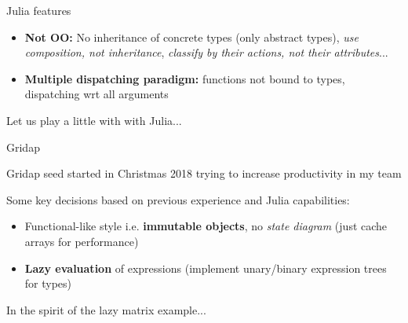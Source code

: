\begin{frame}{Julia features}

\begin{itemize}

  \item \textbf{Not OO:} No inheritance of concrete types (only abstract types), \emph{use composition, not inheritance}, \emph{classify by their actions, not their attributes}...

  \item \textbf{Multiple dispatching paradigm:} functions not bound to types, dispatching wrt all arguments


\end{itemize}

\pause

{\large \color{red} Let us play a little with with Julia...}

\end{frame}

\begin{frame}{Gridap}

Gridap seed started in Christmas 2018 trying to increase productivity in my team

Some key decisions based on previous experience and Julia capabilities:

\begin{itemize}

  \item Functional-like style i.e. \textbf{immutable objects}, no \emph{state diagram} (just cache arrays for performance)

  \item \textbf{Lazy evaluation} of expressions (implement unary/binary expression trees for types)

\end{itemize}

In the spirit of the lazy matrix example...

\end{frame}

